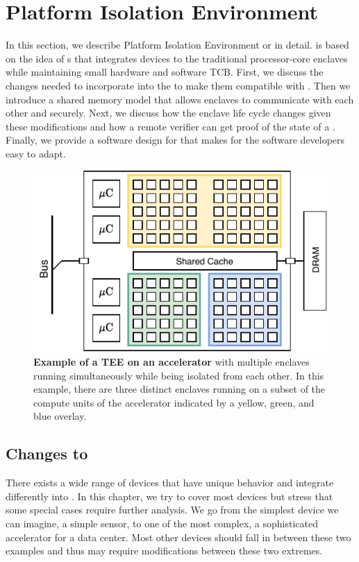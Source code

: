 \section{Platform Isolation Environment}
\label{sec:approach}

In this section, we describe Platform Isolation Environment or \name in detail. \name is based on the idea of \nameenclave{}s that integrates \sphw devices to the traditional processor-core enclaves while maintaining small hardware and software TCB. First, we discuss the changes needed to incorporate into the \sphw to make them compatible with \name. Then we introduce a shared memory model that allows enclaves to communicate with each other and \sphw securely. Next, we discuss how the enclave life cycle changes given these modifications and how a remote verifier can get proof of the state of a \nameenclave{}. Finally, we provide a software design for \name that makes \name for the software developers easy to adapt.


 \begin{figure}[t]
     \centering
     \includegraphics[width=0.8\linewidth]{chapters/PIE/images/accelerator.pdf}
     \caption[Example of a TEE on an accelerator with multiple enclaves running simultaneously while being isolated from each other]{\textbf{Example of a TEE on an accelerator} with multiple enclaves running simultaneously while being isolated from each other. In this example, there are three distinct enclaves running on a subset of the compute units of the accelerator indicated by a yellow, green, and blue overlay.}
     \label{fig:accelerator}
 \end{figure}

\subsection{Changes to \sphw} There exists a wide range of \sphw{} devices that have unique behavior and integrate differently into \name{}.  In this chapter, we try to cover most devices but stress that some special cases require further analysis. We go from the simplest \sphw device we can imagine, a simple sensor, to one of the most complex, a sophisticated accelerator for a data center. Most other \sphw devices should fall in between these two examples and thus may require modifications between these two extremes. 

